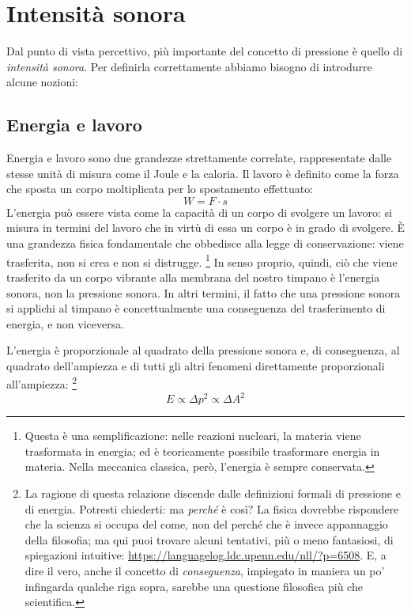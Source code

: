 \section{Intensità sonora}

Dal punto di vista percettivo, più importante del concetto di pressione è quello di \emph{intensità sonora}. Per definirla correttamente abbiamo bisogno di introdurre alcune nozioni:


\subsection{Energia e lavoro}
Energia e lavoro sono due grandezze strettamente correlate, rappresentate dalle stesse unità di misura come il Joule e la caloria. Il lavoro è definito come la forza che sposta un corpo moltiplicata per lo spostamento effettuato:
\begin{equation}
W = F \cdot s
\end{equation}
L'energia può essere vista come la capacità di un corpo di svolgere un lavoro: si misura in termini del lavoro che in virtù di essa un corpo è in grado di svolgere. È una grandezza fisica fondamentale che obbedisce alla legge di conservazione: viene trasferita, non si crea e non si distrugge.%
\footnote{Questa è una semplificazione: nelle reazioni nucleari, la materia viene trasformata in energia; ed è teoricamente possibile trasformare energia in materia. Nella meccanica classica, però, l'energia è sempre conservata.}
In senso proprio, quindi, ciò che viene trasferito da un corpo vibrante alla membrana del nostro timpano è l'energia sonora, non la pressione sonora. In altri termini, il fatto che una pressione sonora si applichi al timpano è concettualmente una conseguenza del trasferimento di energia, e non viceversa.

L'energia è proporzionale al quadrato della pressione sonora e, di conseguenza, al quadrato dell'ampiezza e di tutti gli altri fenomeni direttamente proporzionali all'ampiezza:%
\footnote{La ragione di questa relazione discende dalle definizioni formali di pressione e di energia. Potresti chiederti: ma \emph{perché} è così? La fisica dovrebbe rispondere che la scienza si occupa del come, non del perché che è invece appannaggio della filosofia; ma qui puoi trovare alcuni tentativi, più o meno fantasiosi, di spiegazioni intuitive: \url{https://languagelog.ldc.upenn.edu/nll/?p=6508}. E, a dire il vero, anche il concetto di \emph{conseguenza}, impiegato in maniera un po' infingarda qualche riga sopra, sarebbe una questione filosofica più che scientifica.}
\begin{equation}
E \propto \Delta p^2 \propto \Delta A^2
\end{equation}



